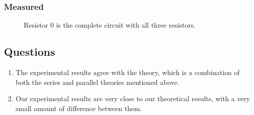 \documentclass{article}
\begin{document}
\subsubsection{Measured}
\begin{figure}[H]
    \begin{center}
        \caption{Resistor 0 is the complete circuit with all three resistors.}
    \end{center}
\end{figure}
\subsection{Questions}
\begin{enumerate}
    \item The experimental results agree with the theory, which is a combination of both the series and parallel theories mentioned above.
    \item Our experimental results are very close to our theoretical results, with a very small amount of difference between them.
\end{enumerate}
\end{document}
